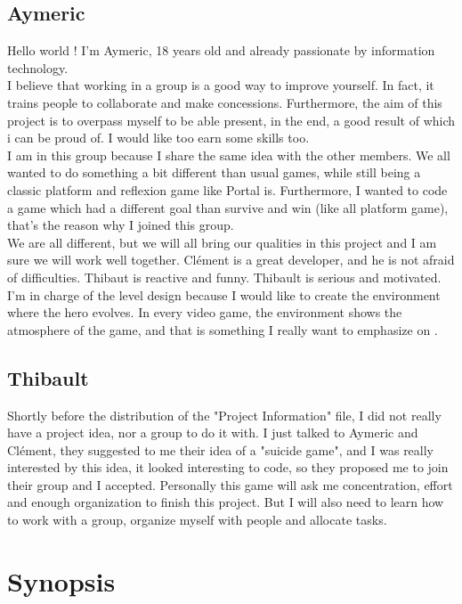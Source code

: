 \documentclass[twoside,12pt]{report}	%
\begin{document}
		\section{Aymeric}

			Hello world ! I'm Aymeric, 18 years old and already passionate by information technology.
            \\
			I believe that working in a group is a good way to improve yourself. In fact, it trains people to collaborate and make concessions. Furthermore, the aim of this project is to overpass myself to be able present, in the end, a good result of which i can be proud of. I would like too earn some skills too.
			\\
			I am in this group because I share the same idea with the other members. We all wanted to do something a bit different than usual games, while still being a classic platform and reflexion game like Portal is. Furthermore, I wanted to code a game which had a different goal than survive and win (like all platform game), that's the reason why I joined this group.
		 	\\
			We are all different, but we will all bring our qualities in this project and I am sure we will work well together. Clément is a great developer, and he is not afraid of difficulties. Thibaut is reactive and funny. Thibault is serious and motivated.
			\\
			I'm in charge of the level design because I would like to create the environment where the hero evolves. In every video game, the environment shows the atmosphere of the game, and that is something I really want to emphasize on .

		\section{Thibault}

			Shortly before the distribution of the "Project Information" file, I did not really have a project idea, nor a group to do it with. I just talked to Aymeric and Clément, they suggested to me their idea of a "suicide game", and I was really interested by this idea, it looked interesting to code, so they proposed me to join their group and I accepted. Personally this game will ask me concentration, effort and enough organization to finish this project. But I will also need to learn how to work with a group, organize myself with people and allocate tasks.

	\chapter{Synopsis}
\end{document}
